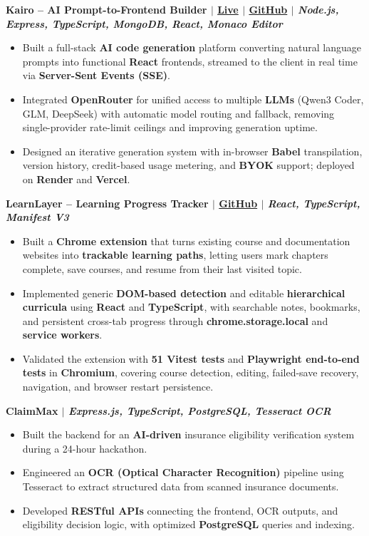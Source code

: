 \documentclass[letterpaper,11pt]{article}
\newcommand{\resumeItem}[1]{\item\small{#1}}
\newcommand{\resumeProjectHeading}[1]{
  \item \textbf{#1}\vspace{-8pt}
}
\newcommand{\resumeItemListStart}{\begin{itemize}[leftmargin=0.15in, itemsep=0pt, topsep=2pt, parsep=0pt]}
\newcommand{\resumeItemListEnd}{\end{itemize}\vspace{-8pt}}
\begin{document}
\resumeProjectHeading
    {\textbf{Kairo -- AI Prompt-to-Frontend Builder}
    $|$ \href{https://kairo-theta-bice.vercel.app/}{Live}
    $|$ \href{https://github.com/aaditya-singh-21/Kairo}{GitHub}
    $|$ \emph{Node.js, Express, TypeScript, MongoDB, React, Monaco Editor}}{}
    \resumeItemListStart
      \resumeItem{Built a full-stack \textbf{AI code generation} platform converting natural language prompts into functional \textbf{React} frontends, streamed to the client in real time via \textbf{Server-Sent Events (SSE)}.}
      \resumeItem{Integrated \textbf{OpenRouter} for unified access to multiple \textbf{LLMs} (Qwen3 Coder, GLM, DeepSeek) with automatic model routing and fallback, removing single-provider rate-limit ceilings and improving generation uptime.}
      \resumeItem{Designed an iterative generation system with in-browser \textbf{Babel} transpilation, version history, credit-based usage metering, and \textbf{BYOK} support; deployed on \textbf{Render} and \textbf{Vercel}.}
    \resumeItemListEnd

  \resumeProjectHeading
    {\textbf{LearnLayer -- Learning Progress Tracker}
    $|$ \href{https://github.com/aaditya-singh-21/LearnLayer}{GitHub}
    $|$ \emph{React, TypeScript, Manifest V3}}{}
    \resumeItemListStart
      \resumeItem{Built a \textbf{Chrome extension} that turns existing course and documentation websites into \textbf{trackable learning paths}, letting users mark chapters complete, save courses, and resume from their last visited topic.}
      \resumeItem{Implemented generic \textbf{DOM-based detection} and editable \textbf{hierarchical curricula} using \textbf{React} and \textbf{TypeScript}, with searchable notes, bookmarks, and persistent cross-tab progress through \textbf{chrome.storage.local} and \textbf{service workers}.}
      \resumeItem{Validated the extension with \textbf{51 Vitest tests} and \textbf{Playwright end-to-end tests} in \textbf{Chromium}, covering course detection, editing, failed-save recovery, navigation, and browser restart persistence.}
    \resumeItemListEnd


  \resumeProjectHeading
    {\textbf{ClaimMax}
    $|$ \emph{Express.js, TypeScript, PostgreSQL, Tesseract OCR}}{}
    \resumeItemListStart
      \resumeItem{Built the backend for an \textbf{AI-driven} insurance eligibility verification system during a 24-hour hackathon.}
      \resumeItem{Engineered an \textbf{OCR (Optical Character Recognition)} pipeline using Tesseract to extract structured data from scanned insurance documents.}
      \resumeItem{Developed \textbf{RESTful APIs} connecting the frontend, OCR outputs, and eligibility decision logic, with optimized \textbf{PostgreSQL} queries and indexing.}
    \resumeItemListEnd
\end{document}
